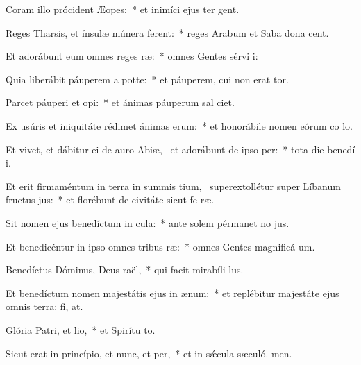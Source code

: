 \item Coram illo prócident Æopes:~* et inimíci ejus ter gent.
\item Reges Tharsis, et ínsulæ múnera ferent:~* reges Arabum et Saba dona cent.
\item Et adorábunt eum omnes reges ræ:~* omnes Gentes sérvi i:
\item Quia liberábit páuperem a potte:~* et páuperem, cui non erat tor.
\item Parcet páuperi et opi:~* et ánimas páuperum sal ciet.
\item Ex usúris et iniquitáte rédimet ánimas erum:~* et honorábile nomen eórum co lo.
\item Et vivet, et dábitur ei de auro Abiæ,~\pscross{} et adorábunt de ipso per:~* tota die benedí i.
\item Et erit firmaméntum in terra in summis tium,~\pscross{} superextollétur super Líbanum fructus jus:~* et florébunt de civitáte sicut fe ræ.
\item Sit nomen ejus benedíctum in cula:~* ante solem pérmanet no jus.
\item Et benedicéntur in ipso omnes tribus ræ:~* omnes Gentes magnificá um.
\item Benedíctus Dóminus, Deus raël,~* qui facit mirabíli lus.
\item Et benedíctum nomen majestátis ejus in ænum:~* et replébitur majestáte ejus omnis terra: fi, at.
\item Glória Patri, et lio,~* et Spirítu to.
\item Sicut erat in princípio, et nunc, et per,~* et in sǽcula sæculó. men.
